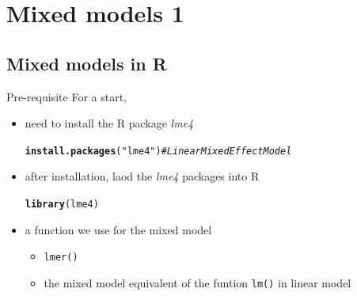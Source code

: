\documentclass[10p]{beamer}\usepackage[]{graphicx}\usepackage[]{color}
\makeatletter
\newcommand{\hlstr}[1]{\textcolor[rgb]{0.192,0.494,0.8}{#1}}%
\newcommand{\hlcom}[1]{\textcolor[rgb]{0.678,0.584,0.686}{\textit{#1}}}%
\newcommand{\hlstd}[1]{\textcolor[rgb]{0.345,0.345,0.345}{#1}}%
\newcommand{\hlkwd}[1]{\textcolor[rgb]{0.737,0.353,0.396}{\textbf{#1}}}%
\newenvironment{kframe}{%
 \def\at@end@of@kframe{}%
 \ifinner\ifhmode%
  \def\at@end@of@kframe{\end{minipage}}%
  \begin{minipage}{\columnwidth}%
 \fi\fi%
 \def\FrameCommand##1{\hskip\@totalleftmargin \hskip-\fboxsep
 \colorbox{shadecolor}{##1}\hskip-\fboxsep
     \hskip-\linewidth \hskip-\@totalleftmargin \hskip\columnwidth}%
 \MakeFramed {\advance\hsize-\width
   \@totalleftmargin\z@ \linewidth\hsize
   \@setminipage}}%
 {\par\unskip\endMakeFramed%
 \at@end@of@kframe}
\newenvironment{knitrout}{}{} %
\makeatother
\begin{document}
\section[Mixed 1]{Mixed models 1}
\subsection{Mixed models in R}
\begin{frame}[fragile]{Pre-requisite}
For a start,
\begin{itemize}
\item need to install the R package \textit{lme4}
\begin{knitrout}
\color{fgcolor}\begin{kframe}
\begin{alltt}
\hlkwd{install.packages}\hlstd{(}\hlstr{"lme4"}\hlstd{)} \hlcom{# Linear Mixed Effect Model}
\end{alltt}
\end{kframe}
\end{knitrout}
\item after installation, laod the \textit{lme4} packages into R
\begin{knitrout}
\color{fgcolor}\begin{kframe}
\begin{alltt}
\hlkwd{library}\hlstd{(lme4)}
\end{alltt}
\end{kframe}
\end{knitrout}
\item a function we use for the mixed model
  \begin{itemize}
  \item \texttt{lmer()}
  \item the mixed model equivalent of the funtion \texttt{lm()} in linear model
  \end{itemize}

\end{itemize}
\end{frame}
\end{document}
